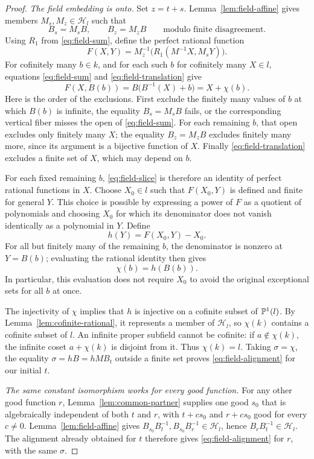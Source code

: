 \begin{proof}
\emph{The field embedding is onto.}
Set \(z=t+s\).  Lemma~\ref{lem:field-affine} gives members
\(M_s,M_z\in\mathcal H_l\) such that
\[
 B_s=M_sB,\qquad B_z=M_zB
 \qquad\text{modulo finite disagreement}.
\]
Using \(R_1\) from \eqref{eq:field-sum}, define the perfect rational function
\[
 F(X,Y)=M_z^{-1}\bigl(R_1(M^{-1}X,M_sY)\bigr).
\]
For cofinitely many \(b\in k\), and for each such \(b\) for cofinitely many
\(X\in l\), equations \eqref{eq:field-sum} and
\eqref{eq:field-translation} give
\begin{equation}\label{eq:field-slice}
 F(X,B(b))=B\bigl(B^{-1}(X)+b\bigr)=X+\chi(b).
\end{equation}
Here is the order of the exclusions.  First exclude the finitely many
values of \(b\) at which \(B(b)\) is infinite, the equality \(B_s=M_sB\)
fails, or the corresponding vertical fiber misses the open of
\eqref{eq:field-sum}.  For each remaining \(b\), that open excludes only
finitely many \(X\); the equality \(B_z=M_zB\) excludes finitely many more,
since its argument is a bijective function of \(X\).  Finally
\eqref{eq:field-translation} excludes a finite set of \(X\), which may
depend on \(b\).

For each fixed remaining \(b\), \eqref{eq:field-slice} is therefore an
identity of perfect rational functions in \(X\).
Choose \(X_0\in l\) such that \(F(X_0,Y)\) is defined and finite for general
\(Y\).  This choice is possible by expressing a power of \(F\) as a
quotient of polynomials and choosing \(X_0\) for which its denominator
does not vanish identically as a polynomial in \(Y\).
Define
\[
 h(Y)=F(X_0,Y)-X_0.
\]
For all but finitely many of the remaining \(b\), the denominator is
nonzero at \(Y=B(b)\); evaluating the rational identity then gives
\[
 \chi(b)=h(B(b)).
\]
In particular, this evaluation does not require \(X_0\) to avoid the
original exceptional sets for all \(b\) at once.

The injectivity of \(\chi\) implies that \(h\) is injective on a cofinite
subset of \(\mathbb P^1(l)\).  By Lemma~\ref{lem:cofinite-rational}, it
represents a member of \(\mathcal H_l\), so \(\chi(k)\) contains a
cofinite subset of \(l\).  An infinite proper subfield cannot be
cofinite: if \(a\notin\chi(k)\), the infinite coset \(a+\chi(k)\) is
disjoint from it.  Thus \(\chi(k)=l\).  Taking \(\sigma=\chi\), the
equality \(\sigma=hB=hMB_t\) outside a finite set proves
\eqref{eq:field-alignment} for our initial \(t\).

\emph{The same constant isomorphism works for every good function.}
For any other good function \(r\), Lemma~\ref{lem:common-partner}
supplies one good \(s_0\) that is algebraically independent of both
\(t\) and \(r\), with \(t+cs_0\) and \(r+cs_0\) good for every \(c\ne0\).
Lemma~\ref{lem:field-affine} gives
\(B_{s_0}B_t^{-1},B_{s_0}B_r^{-1}\in\mathcal H_l\), hence
\(B_rB_t^{-1}\in\mathcal H_l\).  The alignment already obtained for \(t\)
therefore gives \eqref{eq:field-alignment} for \(r\), with the same
\(\sigma\).
\end{proof}

